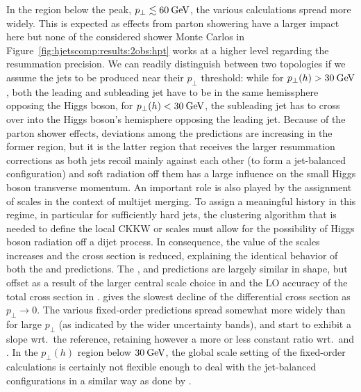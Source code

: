 In the region below the peak, $p_\perp\lesssim 60\text{\:GeV}$, the various
calculations spread more widely. This is expected as effects from
parton showering have a larger impact here but none of the considered
shower Monte Carlos in Figure~\ref{fig:hjetscomp:results:2obs:hpt}
works at a higher level regarding the resummation precision. We can
readily distinguish between two topologies if we assume the jets to be
produced near their $p_\perp$ threshold: while for
$p_\perp(h)>30\text{\:GeV}$, both the leading and subleading jet have to be in
the same hemissphere opposing the Higgs boson, for
$p_\perp(h)<30\text{\:GeV}$, the subleading jet has to cross over into the
Higgs boson's hemisphere opposing the leading jet.
Because of the parton shower effects, deviations among the predictions
are increasing in the former region, but it is the latter region that
receives the larger resummation corrections as both jets recoil mainly
against each other (to form a jet-balanced configuration) and soft
radiation off them has a large influence on the small Higgs boson
transverse momentum. An important role is also played by the
assignment of scales in the context of multijet merging.
To assign a meaningful history in this regime, in particular
for sufficiently hard jets, the clustering algorithm that is needed to
define the local CKKW or \Minlo scales must allow for the possibility
of Higgs boson radiation off a dijet process. In consequence, the value
of the scales increases and the cross section is reduced, explaining
the identical behavior of both the \Sherpa \MEPSatNLO and \Sherpa
\NNLOPS predictions.
The \Herwig, \MGaMC and \Hej predictions are largely similar in shape,
but offset as a result of the larger central scale choice in \MGaMC
and the LO accuracy of the total cross section in \Hej. \Powheg
\NNLOPS gives the slowest decline of the differential cross section as
$p_\perp\to0$.
The various fixed-order predictions spread somewhat more widely than
for large $p_\perp$ (as indicated by the wider uncertainty bands), and
start to exhibit a slope wrt.~the \Powheg reference, retaining however
a more or less constant ratio wrt.~\Herwig and \MGaMC. In the
$p_\perp(h)$ region below $30\text{\:GeV}$, the global scale setting of the
fixed-order calculations is certainly not flexible enough to deal with
the jet-balanced configurations in a similar way as done by \Sherpa.

